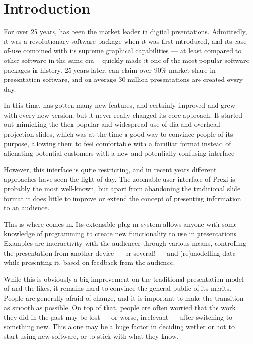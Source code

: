 
 \chapter{Introduction}

  For over 25 years, \ppt* has been the market leader in digital prsentations.
  Admittedly, it was a revolutionary software package when it was first
  introduced, and its ease-of-use combined with its supreme graphical
  capabilities --- at least compared to other software in the same era --
  quickly made it one of the most popular software packages in history. 25
  years later, \ppt* can claim over 90\% market share in presentation software,
  and on average 30 million \ppt presentations are created every day.

  In this time, \ppt* has gotten many new features, and certainly improved and
  grew with every new version, but it never really changed its core approach.
  It started out mimicking the then-popular and widespread use of dia and
  overhead projection slides, which was at the time a good way to convince
  people of its purpose, allowing them to feel comfortable with a familiar
  format instead of alienating potential customers with a new and potentially
  confusing interface.

  However, this interface is quite restricting, and in recent years different
  approaches have seen the light of day. The zoomable user interface of Prezi
  is probably the most well-known, but apart from abandoning the traditional
  slide format it does little to improve or extend the concept of presenting
  information to an audience.

  This is where \mxp comes in. Its extensible plug-in system allows anyone with
  some knowledge of programming to create new functionality to use in
  presentations. Examples are interactivity with the audiencer through various
  means, controlling the presentation from another device --- or several! ---
  and (re)modelling data while presenting it, based on feedback from the
  audience.

  While this is obviously a big improvement on the traditional presentation
  model of \ppt* and the likes, it remains hard to convince the general public
  of its merits. People are generally afraid of change, and it is important to
  make the transition as smooth as possible. On top of that, people are often
  worried that the work they did in the past may be lost --- or worse,
  irrelevant --- after switching to something new. This alone may be a huge
  factor in deciding wether or not to start using new software, or to stick
  with what they know.

